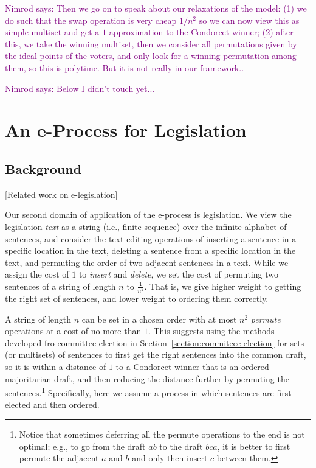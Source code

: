 \documentclass{llncs}
\newcommand{\nimrod}[1]{\textcolor{purple}{Nimrod says: #1}}
\begin{document}
\nimrod{Then we go on to speak about our relaxations of the model:
  (1) we do such that the swap operation is very cheap $1/n^2$ so we can now view this as simple multiset and get a $1$-approximation to the Condorcet winner;
  (2) after this, we take the winning multiset, then we consider all permutations given by the ideal points of the voters, and only look for a winning permutation among them, so this is polytime. But it is not really in our framework..}

\nimrod{Below I didn't touch yet...}


\section{An e-Process for Legislation}
\label{section:e-process legislation}

\subsection{Background}

[Related work on e-legislation]

Our second domain of application of the e-process is legislation.
We view the legislation \emph{text} as a string (i.e., finite sequence) over the infinite alphabet of sentences, and consider the text editing operations of inserting a sentence in a specific location in the text, deleting a sentence from a specific location in the text, and permuting the order of two adjacent sentences in a text. While we assign the cost of $1$ to \emph{insert} and \emph{delete}, we set the cost of permuting two sentences of a string of length $n$ to $\frac{1}{n^2}$.  That is, we give higher weight to getting the right set of sentences, and lower weight to ordering them correctly. 

A string of length $n$ can be set in a chosen order with at most ${n^2}$ \emph{permute} operations at a cost of no more than $1$. This suggests using the methods developed fro committee election in Section~\ref{section:commiteee election} for sets (or multisets) of sentences to first get the right sentences into the common draft, so it is within a distance of $1$ to a Condorcet winner that is an ordered majoritarian draft, and then reducing the distance further by permuting the sentences.\footnote{
Notice that sometimes deferring all the permute operations to the end is not optimal; e.g., to go from the draft $ab$ to the draft $bca$, it is better to first permute the adjacent $a$ and $b$ and only then insert $c$ between them.} Specifically, here we assume a process in which sentences are first elected and then ordered.
\end{document}
